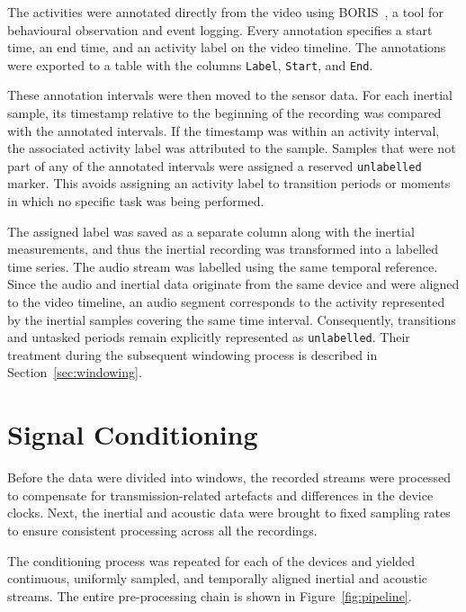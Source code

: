 The activities were annotated directly from the video using
BORIS~\cite{friard2016boris}, a tool for behavioural observation and event
logging. Every annotation specifies a start time, an end time, and an activity
label on the video timeline. The annotations were exported to a table with the
columns \texttt{Label}, \texttt{Start}, and \texttt{End}.

These annotation intervals were then moved to the sensor data. For each
inertial sample, its timestamp relative to the beginning of the recording was
compared with the annotated intervals. If the timestamp was within an activity
interval, the associated activity label was attributed to the sample. Samples
that were not part of any of the annotated intervals were assigned a reserved
\texttt{unlabelled} marker. This avoids assigning an activity label to
transition periods or moments in which no specific task was being performed.

The assigned label was saved as a separate column along with the inertial
measurements, and thus the inertial recording was transformed into a labelled
time series. The audio stream was labelled using the same temporal reference.
Since the audio and inertial data originate from the same device and were
aligned to the video timeline, an audio segment corresponds to the activity
represented by the inertial samples covering the same time interval.
Consequently, transitions and untasked periods remain explicitly represented as
\texttt{unlabelled}. Their treatment during the subsequent windowing process is
described in Section~\ref{sec:windowing}.

\section{Signal Conditioning}
\label{sec:conditioning}

Before the data were divided into windows, the recorded streams were processed
to compensate for transmission-related artefacts and differences in the device
clocks. Next, the inertial and acoustic data were brought to fixed sampling
rates to ensure consistent processing across all the recordings.

The conditioning process was repeated for each of the devices and yielded
continuous, uniformly sampled, and temporally aligned inertial and acoustic
streams. The entire pre-processing chain is shown in Figure~\ref{fig:pipeline}.

